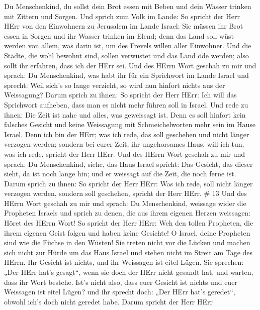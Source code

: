  Du Menschenkind, du sollst dein Brot essen mit Beben und
dein Wasser trinken mit Zittern und Sorgen.  Und sprich zum
Volk im Lande: So spricht der Herr HErr von den Einwohnern zu Jerusalem
im Lande Israel: Sie müssen ihr Brot essen in Sorgen und ihr Wasser
trinken im Elend; denn das Land soll wüst werden von allem, was darin
ist, um des Frevels willen aller Einwohner.  Und die
Städte, die wohl bewohnt sind, sollen verwüstet und das Land öde werden;
also sollt ihr erfahren, dass ich der HErr sei.  Und des
HErrn Wort geschah zu mir und sprach:  Du Menschenkind, was
habt ihr für ein Sprichwort im Lande Israel und sprecht: Weil sich's so
lange verzieht, so wird nun hinfort nichts aus der Weissagung?
 Darum sprich zu ihnen: So spricht der Herr HErr: Ich will
das Sprichwort aufheben, dass man es nicht mehr führen soll in Israel.
Und rede zu ihnen: Die Zeit ist nahe und alles, was geweissagt ist.
 Denn es soll hinfort kein falsches Gesicht und keine
Weissagung mit Schmeichelworten mehr sein im Hause Israel. 
Denn ich bin der HErr; was ich rede, das soll geschehen und nicht länger
verzogen werden; sondern bei eurer Zeit, ihr ungehorsames Haus, will ich
tun, was ich rede, spricht der Herr HErr.  Und des HErrn
Wort geschah zu mir und sprach:  Du Menschenkind, siehe,
das Haus Israel spricht: Das Gesicht, das dieser sieht, da ist noch
lange hin; und er weissagt auf die Zeit, die noch ferne ist.
 Darum sprich zu ihnen: So spricht der Herr HErr: Was ich
rede, soll nicht länger verzogen werden, sondern soll geschehen, spricht
der Herr HErr. \# 13  Und des HErrn Wort geschah zu mir und
sprach:  Du Menschenkind, weissage wider die Propheten
Israels und sprich zu denen, die aus ihrem eigenen Herzen weissagen:
Höret des HErrn Wort!  So spricht der Herr HErr: Weh den
tollen Propheten, die ihrem eigenen Geist folgen und haben keine
Gesichte!  O Israel, deine Propheten sind wie die Füchse in
den Wüsten!  Sie treten nicht vor die Lücken und machen sich
nicht zur Hürde um das Haus Israel und stehen nicht im Streit am Tage
des HErrn.  Ihr Gesicht ist nichts, und ihr Weissagen ist
eitel Lügen. Sie sprechen: „Der HErr hat's gesagt``, wenn sie doch der
HErr nicht gesandt hat, und warten, dass ihr Wort bestehe. 
Ist's nicht also, dass euer Gesicht ist nichts und euer Weissagen ist
eitel Lügen? und ihr sprecht doch: „Der HErr hat's geredet``, obwohl
ich's doch nicht geredet habe.  Darum spricht der Herr HErr
